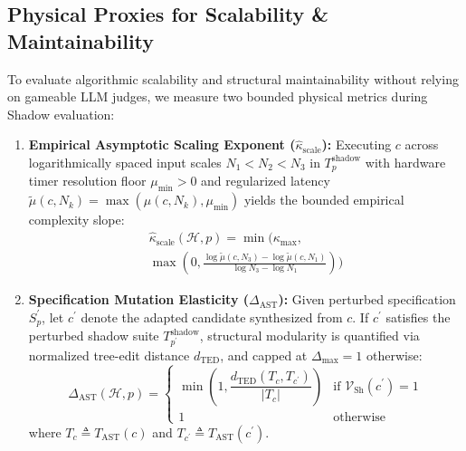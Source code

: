 \documentclass[10pt,twocolumn,letterpaper]{article}
\begin{document}
\subsection{Physical Proxies for Scalability \& Maintainability}
To evaluate algorithmic scalability and structural maintainability without relying on gameable LLM judges, we measure two bounded physical metrics during Shadow evaluation:
\begin{enumerate}
    \item \textbf{Empirical Asymptotic Scaling Exponent ($\hat{\kappa}_{\text{scale}}$):} Executing $c$ across logarithmically spaced input scales $N_{1}<N_{2}<N_{3}$ in $T_{p}^{\text{shadow}}$ with hardware timer resolution floor $\mu_{\min}>0$ and regularized latency $\tilde{\mu}(c,N_{k})=\max(\mu(c,N_{k}),\mu_{\min})$ yields the bounded empirical complexity slope:
    \begin{multline}
    \hat{\kappa}_{\text{scale}}(\mathcal{H},p) = \min\!\Bigg(\kappa_{\max}, \\
    \max\!\left(0, \frac{\log\tilde{\mu}(c,N_{3})-\log\tilde{\mu}(c,N_{1})}{\log N_{3}-\log N_{1}}\right)\Bigg)
    \end{multline}
    \item \textbf{Specification Mutation Elasticity ($\Delta_{\text{AST}}$):} Given perturbed specification $S_{p}^{\prime}$, let $c^{\prime}$ denote the adapted candidate synthesized from $c$. If $c^{\prime}$ satisfies the perturbed shadow suite $T_{p^{\prime}}^{\text{shadow}}$, structural modularity is quantified via normalized tree-edit distance $d_{\text{TED}}$, and capped at $\Delta_{\max}=1$ otherwise:
    \begin{equation}
    \Delta_{\text{AST}}(\mathcal{H},p) = \begin{cases}
    \min\!\left(1, \dfrac{d_{\text{TED}}(T_{c},T_{c^{\prime}})}{|T_{c}|}\right) & \text{if }\mathcal{V}_{\text{Sh}}(c^{\prime})=1 \\[8pt]
    1 & \text{otherwise}
    \end{cases}
    \end{equation}
    where $T_{c}\triangleq T_{\text{AST}}(c)$ and $T_{c^{\prime}}\triangleq T_{\text{AST}}(c^{\prime})$.
\end{enumerate}
\end{document}

